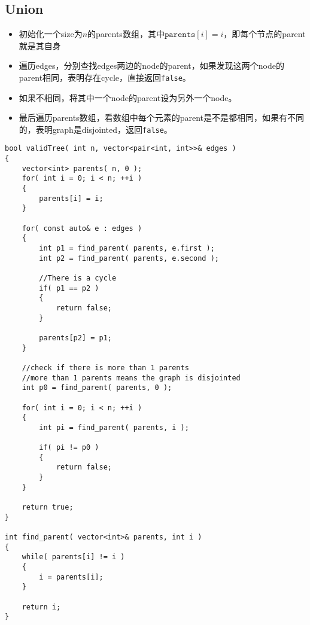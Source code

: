 \subsection{Union}
\begin{itemize}
\item 初始化一个size为$n$的parents数组，其中$\texttt{parents}[i]=i$，即每个节点的parent就是其自身
\item 遍历edges，分别查找edges两边的node的parent，如果发现这两个node的parent相同，表明存在cycle，直接返回\texttt{false}。
\item 如果不相同，将其中一个node的parent设为另外一个node。
\item 最后遍历parents数组，看数组中每个元素的parent是不是都相同，如果有不同的，表明graph是disjointed，返回\texttt{false}。
\end{itemize}
\begin{lstlisting}[style=customc, caption={Union Find}]
bool validTree( int n, vector<pair<int, int>>& edges )
{
    vector<int> parents( n, 0 );
    for( int i = 0; i < n; ++i )
    {
        parents[i] = i;
    }

    for( const auto& e : edges )
    {
        int p1 = find_parent( parents, e.first );
        int p2 = find_parent( parents, e.second );

        //There is a cycle
        if( p1 == p2 )
        {
            return false;
        }

        parents[p2] = p1;
    }

    //check if there is more than 1 parents
    //more than 1 parents means the graph is disjointed
    int p0 = find_parent( parents, 0 );

    for( int i = 0; i < n; ++i )
    {
        int pi = find_parent( parents, i );

        if( pi != p0 )
        {
            return false;
        }
    }

    return true;
}

int find_parent( vector<int>& parents, int i )
{
    while( parents[i] != i )
    {
        i = parents[i];
    }

    return i;
}
\end{lstlisting}